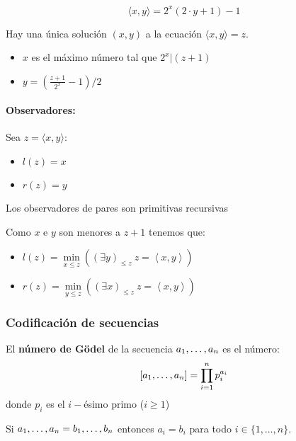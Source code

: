 $$\langle x,y \rangle = 2^x(2\cdot y + 1) - 1$$

\begin{proposicion}
Hay una única solución $(x,y)$ a la ecuación $\langle x,y \rangle = z$.
\begin{itemize}
	\item $x$ es el máximo número tal que $2^x | (z+1)$
	\item $y = (\frac{z+1}{2^x} - 1)/2$
\end{itemize}

\end{proposicion} 
\paragraph{Observadores:} Sea $z = \langle x,y \rangle$:
\begin{itemize}
	\item $l(z) = x$
	\item $r(z) = y$
\end{itemize}

\begin{proposicion}\label{proposicion::ObservadoresParesSonPR}
Los observadores de pares son primitivas recursivas
\end{proposicion}
\begin{demo}
	Como $x$ e $y$ son menores a $z +1$ tenemos que:
	\begin{itemize}
		\item $l(z) = \min\limits_{x\leq z} \left(\left(\exists y\right)_{\leq z}~ z = \left\langle x,y\right\rangle\right)$
		\item $r(z) = \min\limits_{y\leq z} \left(\left(\exists x\right)_{\leq z}~ z = \left\langle x,y\right\rangle\right)$
	\end{itemize}
\end{demo}

\subsubsection{Codificación de secuencias}\label{secc::codSecuencias}
El \textbf{número de Gödel} de la secuencia $a_1,\dots, a_{n}$ es el número:
$$[a_1,\dots, a_{n}] = \prod_{i=1}^{n} p_i^{a_i}$$
donde $p_i$ es el $i-$ésimo primo ($i\geq 1$)

\begin{teorema}
Si $a_1,\dots, a_{n} = b_1,\dots, b_{n}$ entonces $a_i = b_i$ para todo $i\in\{1,\dots,n\}$.
\end{teorema}

